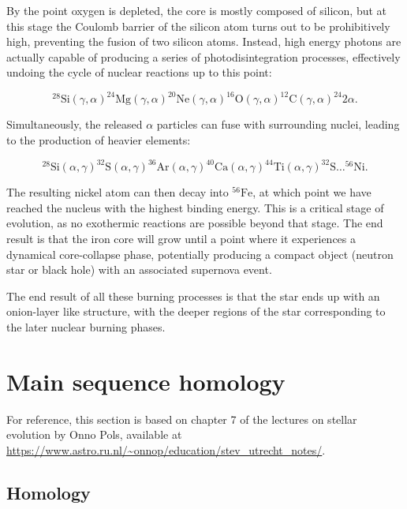 \documentclass[twocolumn]{article}
\begin{document}
\begin{itemize}
  By the point oxygen is depleted, the core is mostly composed of
  silicon, but at this stage the Coulomb barrier of the silicon atom
  turns out to be prohibitively high, preventing the fusion of two
  silicon atoms. Instead, high energy photons are actually capable of
  producing a series of photodisintegration processes, effectively
  undoing the cycle of nuclear reactions up to this point:

  \[^{28}\mathrm{Si}(\gamma,\alpha)^{24}\mathrm{Mg}(\gamma,\alpha)^{20}\mathrm{Ne}(\gamma,\alpha)^{16}\mathrm{O}(\gamma,\alpha)^{12}\mathrm{C}(\gamma,\alpha)^{24}2\alpha.\]

  Simultaneously, the released \(\alpha\) particles can fuse with
  surrounding nuclei, leading to the production of heavier elements:

  \[^{28}\mathrm{Si}(\alpha,\gamma)^{32}\mathrm{S}(\alpha,\gamma)^{36}\mathrm{Ar}(\alpha,\gamma)^{40}\mathrm{Ca}(\alpha,\gamma)^{44}\mathrm{Ti}(\alpha,\gamma)^{32}\mathrm{S}\dots^{56}\mathrm{Ni}.\]

  The resulting nickel atom can then decay into \(^{56}\mathrm{Fe}\), at
  which point we have reached the nucleus with the highest binding
  energy. This is a critical stage of evolution, as no exothermic
  reactions are possible beyond that stage. The end result is that the
  iron core will grow until a point where it experiences a dynamical
  core-collapse phase, potentially producing a compact object (neutron
  star or black hole) with an associated supernova event.
\end{itemize}

The end result of all these burning processes is that the star ends up
with an onion-layer like structure, with the deeper regions of the star
corresponding to the later nuclear burning phases.

\hypertarget{main-sequence-homology}{%
\section{Main sequence homology}\label{main-sequence-homology}}

For reference, this section is based on chapter 7 of the lectures on
stellar evolution by Onno Pols, available at
\url{https://www.astro.ru.nl/~onnop/education/stev_utrecht_notes/}.

\hypertarget{homology}{%
\subsection{Homology}\label{homology}}
\end{document}
